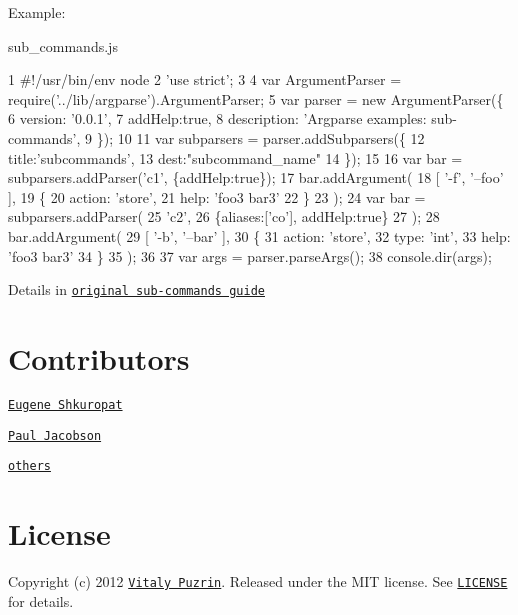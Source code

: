 Example\+:

sub\+\_\+commands.\+js 
\begin{DoxyCode}
1 #!/usr/bin/env node
2 'use strict';
3 
4 var ArgumentParser = require('../lib/argparse').ArgumentParser;
5 var parser = new ArgumentParser(\{
6   version: '0.0.1',
7   addHelp:true,
8   description: 'Argparse examples: sub-commands',
9 \});
10 
11 var subparsers = parser.addSubparsers(\{
12   title:'subcommands',
13   dest:"subcommand\_name"
14 \});
15 
16 var bar = subparsers.addParser('c1', \{addHelp:true\});
17 bar.addArgument(
18   [ '-f', '--foo' ],
19   \{
20     action: 'store',
21     help: 'foo3 bar3'
22   \}
23 );
24 var bar = subparsers.addParser(
25   'c2',
26   \{aliases:['co'], addHelp:true\}
27 );
28 bar.addArgument(
29   [ '-b', '--bar' ],
30   \{
31     action: 'store',
32     type: 'int',
33     help: 'foo3 bar3'
34   \}
35 );
36 
37 var args = parser.parseArgs();
38 console.dir(args);
\end{DoxyCode}


Details in \href{http://docs.python.org/dev/library/argparse.html#sub-commands}{\tt original sub-\/commands guide}

\section*{Contributors }


\begin{DoxyItemize}
\item \href{https://github.com/shkuropat}{\tt Eugene Shkuropat}
\item \href{https://github.com/hpaulj}{\tt Paul Jacobson}
\end{DoxyItemize}

\href{https://github.com/nodeca/argparse/graphs/contributors}{\tt others}

\section*{License }

Copyright (c) 2012 \href{https://github.com/puzrin}{\tt Vitaly Puzrin}. Released under the M\+I\+T license. See \href{https://github.com/nodeca/argparse/blob/master/LICENSE}{\tt L\+I\+C\+E\+N\+S\+E} for details. 